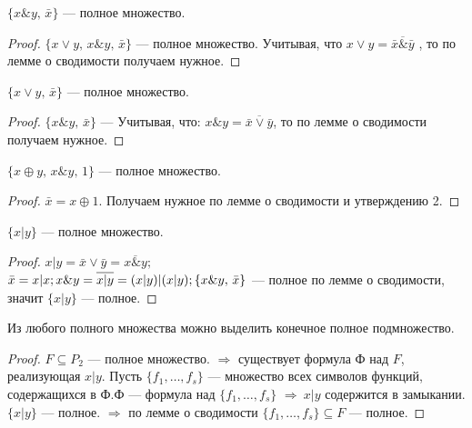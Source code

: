 \begin{statement}
$	\{x\&y,\, \bar{x} \}$ --- полное множество. 
\end{statement}
\begin{proof}
			$\{x\vee y,\, x \& y,\, \bar{x} \}$ --- полное множество. Учитывая, что $x \vee y = \overline{\bar{x}\&\bar{y} } $ , то по лемме о сводимости получаем нужное. \end{proof}	
\begin{statement}
	$\{x \vee y,\, \bar{x} \}$ --- полное множество.  
\end{statement}
\begin{proof}
	$	\{x\&y,\, \bar{x} \}$ ---   Учитывая, что: $x \& y =  \overline{\bar{x}\vee\bar{y} }$, то по лемме о сводимости получаем нужное.
\end{proof}
\begin{statement} 
$\{x \oplus y,\, x \& y,\, 1\}$ --- полное множество.
\end{statement}
\begin{proof}
	$\bar{x}=x \oplus 1. $ Получаем нужное по лемме о сводимости и утверждению 2.
\end{proof}	
\begin{statement}
	$\{x | y\}$ --- полное множество. 
\end{statement}
\begin{proof}
	$x|y=\bar{x} \vee \bar{y}=\overline{x \& y};$ \\
	$\bar{x}=x | x; \\
	x \& y=\overline{x|y}=(x|y)|(x|y); \\
	\{x \& y,\, \bar{x}\}$ --- полное по лемме о сводимости, значит $\{x|y\}$ --- полное.   
\end{proof}
\begin{corollary}
	Из любого полного множества можно выделить конечное полное подмножество.
\end{corollary}
\begin{proof}
	$F\subseteq P_2$ --- полное множество. $\Rightarrow$ существует формула Ф над $F$, реализующая ${x|y}$. Пусть $\{f_1, \ldots, f_s\}$ --- множество всех символов функций, содержащихся в Ф.Ф --- формула над $\{f_1, \ldots, f_s\}$ $\Rightarrow  ~ x|y$ содержится в замыкании. $\{x|y\}$ --- полное. $\Rightarrow$ по лемме о сводимости $\{f_1, \ldots, f_s\} \subseteq F$ --- полное.
\end{proof}  